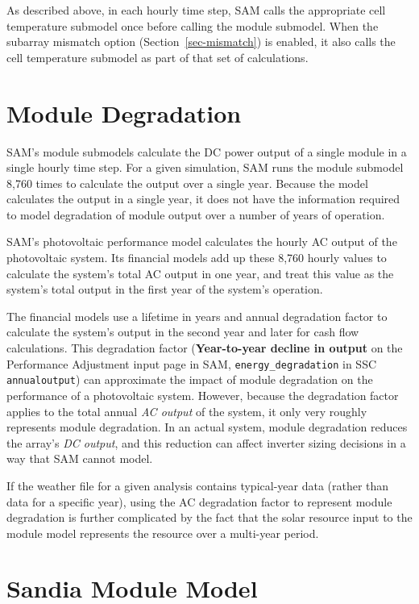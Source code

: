 \documentclass[12pt,letterpaper]{article}
\begin{document}
As described above, in each hourly time step, SAM calls the appropriate cell temperature submodel once before calling the module submodel. When the subarray mismatch option (Section~\ref{sec-mismatch}) is enabled, it also calls the cell temperature submodel as part of that set of calculations.

\section{Module Degradation}

SAM's module submodels calculate the DC power output of a single module in a single hourly time step. For a given simulation, SAM runs the module submodel 8,760 times to calculate the output over a single year. Because the model calculates the output in a single year, it does not have the information required to model degradation of module output over a number of years of operation.

SAM's photovoltaic performance model calculates the hourly AC output of the photovoltaic system. Its financial models add up these 8,760 hourly values to calculate the system's total AC output in one year, and treat this value as the system's total output in the first year of the system's operation.

The financial models use a lifetime in years and annual degradation factor to calculate the system's output in the second year and later for cash flow calculations. This degradation factor (\textbf{Year-to-year decline in output} on the Performance Adjustment input page in SAM, \texttt{energy\_degradation} in SSC \texttt{annualoutput}) can approximate the impact of module degradation on the performance of a photovoltaic system. However, because the degradation factor applies to the total annual \textit{AC output} of the system, it only very roughly represents module degradation. In an actual system, module degradation reduces the array's \textit{DC output}, and this reduction can affect inverter sizing decisions in a way that SAM cannot model.

If the weather file for a given analysis contains typical-year data (rather than data for a specific year), using the AC degradation factor to represent module degradation is further complicated by the fact that the solar resource input to the module model represents the resource over a multi-year period.

\section{Sandia Module Model}\label{sec-sandiamodule}
\end{document}
